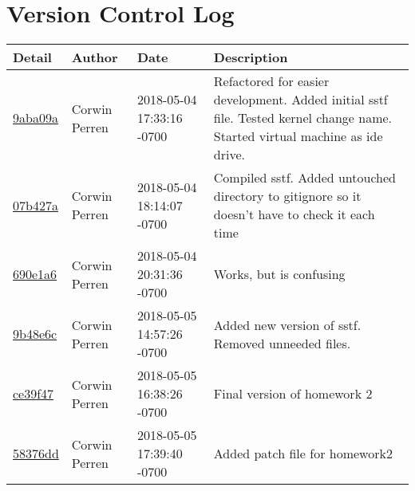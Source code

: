 \section{Version Control Log}
\begin{center}
\begin{tabular}{l l l l}	\textbf{Detail} & \textbf{Author} & \textbf{Date} &\textbf{Description}\\\hline

\href{.//commit/9aba09af70810709d27af320d740e677c498b79f}{9aba09a} & Corwin Perren & 2018-05-04 17:33:16 -0700 &Refactored for easier development. Added initial sstf file. Tested kernel change name. Started virtual machine as ide drive.\\\hline
\href{.//commit/07b427a502f82dd300e79f2bce18a2f56a65fc55}{07b427a} & Corwin Perren & 2018-05-04 18:14:07 -0700 &Compiled sstf. Added untouched directory to gitignore so it doesn't have to check it each time\\\hline
\href{.//commit/690e1a6793997bea1e327810eca7dd2838b131a3}{690e1a6} & Corwin Perren & 2018-05-04 20:31:36 -0700 &Works, but is confusing\\\hline
\href{.//commit/9b48e6ccf10fa5b356e2ce6f1ef185c8af0c3e8b}{9b48e6c} & Corwin Perren & 2018-05-05 14:57:26 -0700 &Added new version of sstf. Removed unneeded files.\\\hline
\href{.//commit/ce39f4775a5172d033dcd86a0ac0613af748830b}{ce39f47} & Corwin Perren & 2018-05-05 16:38:26 -0700 &Final version of homework 2\\\hline
\href{.//commit/58376ddc3bb9791d8c277ef5612118bbe6522f55}{58376dd} & Corwin Perren & 2018-05-05 17:39:40 -0700 &Added patch file for homework2\\\hline



\end{tabular}
\end{center}